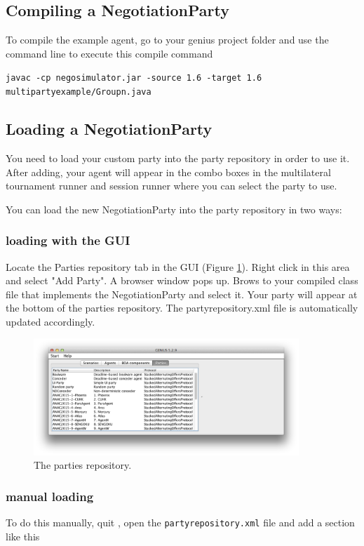 \documentclass[]{article}
\begin{document}
\subsection{Compiling a NegotiationParty}


To compile the example agent, go to your genius project folder and use the command line to execute this compile command

\verb|javac -cp negosimulator.jar -source 1.6 -target 1.6  multipartyexample/Groupn.java|

\subsection{Loading a NegotiationParty}

You need to load your custom party into the party repository in order to use it. After adding, your agent will appear in the combo boxes in the multilateral tournament runner and session runner where you can select the party to use.

You can load the new NegotiationParty into the party repository in two ways:
\subsubsection{loading with the GUI}
Locate the Parties repository tab in the GUI (Figure \ref{fig:partiesrepo}). Right click in this area and select "Add Party". A browser window pops up. Brows to  your compiled class file that implements the NegotiationParty and select it. Your party will appear at the bottom of the parties repository. The partyrepository.xml file is automatically updated accordingly.

\begin{figure}[h!] 
	\center
	\includegraphics[width=10cm]{media/partiesrepo.png}
	\caption{The parties repository.}
	\label{fig:partiesrepo}
\end{figure}

\subsubsection{manual loading}
To do this manually, quit \Genius , open the \verb|partyrepository.xml| file and add a section like this
\end{document}
